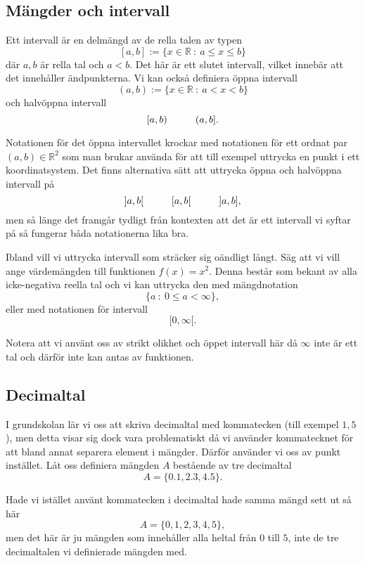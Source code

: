 \documentclass[titlepage]{article}
\begin{document}

\subsection{Mängder och intervall}

Ett intervall är en delmängd av de rella talen av typen
$$[a,b] := \{x \in \mathbb{R}\: : \: a\leq x \leq b\}$$
där $a,b$ är rella tal och $a<b$. Det här är ett slutet intervall, vilket innebär att det innehåller ändpunkterna. Vi kan också definiera öppna intervall 
$$(a,b) := \{x \in \mathbb{R} \: : \: a<x<b\}$$
och halvöppna intervall
$$[a,b) \hspace{10mm} (a,b].$$

Notationen för det öppna intervallet krockar med notationen för ett ordnat par $(a,b) \in \mathbb{R}^2$ som man brukar använda för att till exempel uttrycka en punkt i ett koordinatsystem. Det finns alternativa sätt att uttrycka öppna och halvöppna intervall på
$$]a,b[ \hspace{10mm} [a,b[ \hspace{10mm} ]a,b],$$
men så länge det framgår tydligt från kontexten att det är ett intervall vi syftar på så fungerar båda notationerna lika bra.

Ibland vill vi uttrycka intervall som sträcker sig oändligt långt. Säg att vi vill ange värdemängden till funktionen $f(x) = x^2$. Denna består som bekant av alla icke-negativa reella tal och vi kan uttrycka den med mängdnotation
$$\{ a \: : \: 0 \leq a < \infty \},$$
eller med notationen för intervall
$$[0, \infty[.$$

Notera att vi använt oss av strikt olikhet och öppet intervall här då $\infty$ inte är ett tal och därför inte kan antas av funktionen.




\subsection{Decimaltal}

I grundskolan lär vi oss att skriva decimaltal med kommatecken (till exempel $1,5$), men detta visar sig dock vara problematiskt då vi använder kommatecknet för att bland annat separera element i mängder. Därför använder vi oss av punkt instället. Låt oss definiera mängden $A$ bestående av tre decimaltal
$$A = \{0.1,2.3,4.5\}.$$

Hade vi istället använt kommatecken i decimaltal hade samma mängd sett ut så här
$$A = \{0,1,2,3,4,5\},$$
men det här är ju mängden som innehåller alla heltal från $0$ till $5$, inte de tre decimaltalen vi definierade mängden med.
\end{document}
